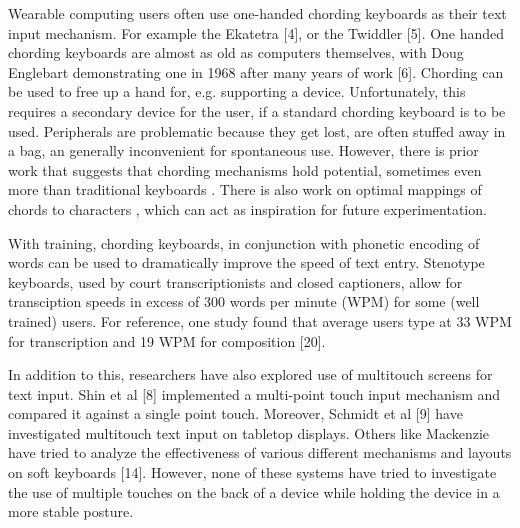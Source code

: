 Wearable computing users often use one-handed chording keyboards as their text input mechanism.  For example the Ekatetra [4], or the Twiddler [5].  One handed chording keyboards are almost as old as computers themselves, with Doug Englebart demonstrating one in 1968 after many years of work [6]. Chording can be used to free up a hand for, e.g. supporting a device.  Unfortunately, this requires a secondary device for the user, if a standard chording keyboard is to be used.  Peripherals are problematic because they get lost, are often stuffed away in a bag, an generally inconvenient for spontaneous use. However, there is prior work that suggests that chording mechanisms hold potential, sometimes even more than traditional keyboards . There is also work on optimal mappings of chords to characters , which can act as inspiration for future experimentation. 

With training, chording keyboards, in conjunction with phonetic encoding of words can be used to dramatically improve the speed of text entry.  Stenotype keyboards, used by court transcriptionists and closed captioners, allow for transciption speeds in excess of 300 words per minute (WPM) for some (well trained) users.  For reference, one study found that average users type at 33 WPM for transcription and 19 WPM for composition [20].

In addition to this, researchers have also explored use of multitouch screens for text input. Shin et al [8] implemented a multi-point touch input mechanism and compared it against a single point touch. Moreover, Schmidt et al [9] have investigated multitouch text input on tabletop displays. Others like Mackenzie have tried to analyze the effectiveness of various different mechanisms and layouts on soft keyboards [14]. However, none of these systems have tried to investigate the use of multiple touches on the back of a device while holding the device in a more stable posture.
